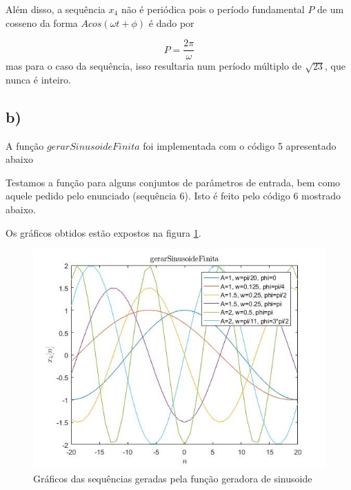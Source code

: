 \documentclass[a4paper, 12pt]{article}
\begin{document}
Além disso, a sequência $x_4$ não é periódica pois o período fundamental $P$ de um cosseno da forma $Acos(\omega t + \phi)$ é dado por 

$$P=\frac{2\pi}{\omega}$$
mas para o caso da sequência, isso resultaria num período múltiplo de $\sqrt{23}$, que nunca é inteiro.

\subsection{b)}

A função $gerarSinusoideFinita$ foi implementada com o código 5 apresentado abaixo



Testamos a função para alguns conjuntos de parâmetros de entrada, bem como aquele pedido pelo enunciado (sequência 6). Isto é feito pelo código 6 mostrado abaixo.



Os gráficos obtidos estão expostos na figura \ref{fig:2b}. 

\begin{figure}[H]
	\centering
	\includegraphics[scale=0.7]{../Imagens/ex2/b.jpg}  
	\caption{Gráficos das sequências geradas pela função geradora de sinusoide}
	\label{fig:2b}
\end{figure}
\end{document}
